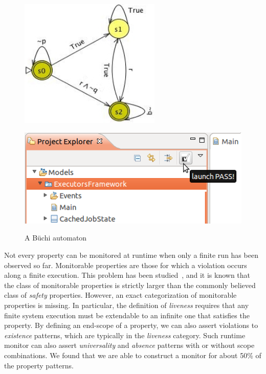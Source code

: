 \documentclass[letter]{llncs}
\begin{document}
\begin{figure}[!t]
 \centering
\begin{minipage}[!t]{0.5\linewidth}
\includegraphics[width=0.6\textwidth]{./Buchi2.jpg}%
\caption{A B\"uchi automaton}
\label{fig:Buchi}
\end{minipage}%
\begin{minipage}[!t]{0.5\linewidth}
\includegraphics[width=1.0\textwidth]{./PASSlaunch.png}%
\label{fig:PASSlaunch}
%
\end{minipage}
\end{figure}

Not every property can be monitored at runtime when only a finite run has been 
observed so far. Monitorable properties are those for which a violation occurs along a finite execution.
This problem has been studied~\cite{DBLP:journals/corr/abs-1006-3638}, and it is known that the class of 
monitorable properties is strictly larger than the commonly believed class of \emph{safety} properties.
However, an exact categorization of monitorable properties is missing.
In particular, the definition of \emph{liveness} requires that any finite system
execution must be extendable to an infinite one that satisfies the property. 
By defining an end-scope of a property, we can also assert
violations to \emph{existence} patterns, which are typically in the \emph{liveness} category. 
Such runtime monitor can also assert \emph{universality} and \emph{absence} patterns 
with or without scope combinations. We found that we are able to construct 
a monitor for about 50\% of the property patterns.
\end{document}
